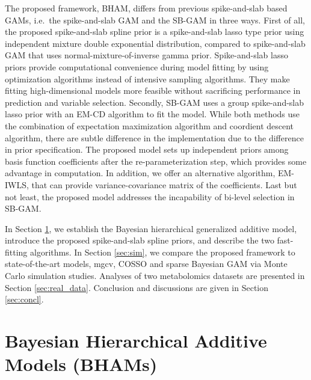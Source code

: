 \documentclass[AMA,STIX1COL,]{WileyNJD-v2}
\begin{document}
The proposed framework, BHAM, differs from previous spike-and-slab based
GAMs, i.e.~the spike-and-slab GAM \citep{Scheipl2012} and the SB-GAM
\citep{Bai2021} in three ways. First of all, the proposed spike-and-slab
spline prior is a spike-and-slab lasso type prior using independent
mixture double exponential distribution, compared to spike-and-slab GAM
that uses normal-mixture-of-inverse gamma prior. Spike-and-slab lasso
priors provide computational convenience during model fitting by using
optimization algorithms instead of intensive sampling algorithms. They
make fitting high-dimensional models more feasible without sacrificing
performance in prediction and variable selection. Secondly, SB-GAM uses
a group spike-and-slab lasso prior with an EM-CD algorithm to fit the
model. While both methods use the combination of expectation
maximization algorithm and coordient descent algorithm, there are subtle
difference in the implementation due to the difference in prior
specification. The proposed model sets up independent priors among basis
function coefficients after the re-parameterization step, which provides
some advantage in computation. In addition, we offer an alternative
algorithm, EM-IWLS, that can provide variance-covariance matrix of the
coefficients. Last but not least, the proposed model addresses the
incapability of bi-level selection in SB-GAM.

In Section \ref{sec:BHAM}, we establish the Bayesian hierarchical
generalized additive model, introduce the proposed spike-and-slab spline
priors, and describe the two fast-fitting algorithms. In Section
\ref{sec:sim}, we compare the proposed framework to state-of-the-art
models, mgcv, COSSO and sparse Bayesian GAM via Monte Carlo simulation
studies. Analyses of two metabolomics datasets are presented in Section
\ref{sec:real_data}. Conclusion and discussions are given in Section
\ref{sec:concl}.

\section{Bayesian Hierarchical Additive Models (BHAMs)}
\label{sec:BHAM}
\end{document}
